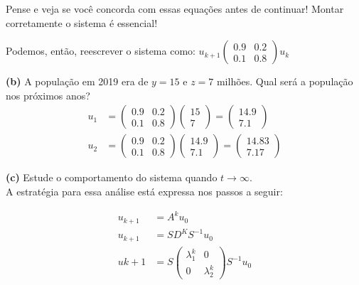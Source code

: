 \documentclass[12pt]{article}
\begin{document}
	Pense e veja se você concorda com essas equações antes de continuar! Montar corretamente o sistema é essencial!
	
	Podemos, então, reescrever o sistema como:
	$u_{k+1}\begin{pmatrix}
		0.9 & 0.2 \\
		0.1 & 0.8
	\end{pmatrix}u_k$
	
	\textbf{(b)} A população em 2019 era de $y=15$ e $z=7$ milhões. Qual será a população nos próximos anos?\\
	
	\begin{align*}
		u_1&=\begin{pmatrix}
			0.9 & 0.2 \\
			0.1 & 0.8
		\end{pmatrix}\begin{pmatrix}
			15 \\
			7
		\end{pmatrix}=
		\begin{pmatrix}
			14.9 \\
			7.1
		\end{pmatrix}\\
		u_2&=\begin{pmatrix}
			0.9 & 0.2 \\
			0.1 & 0.8
		\end{pmatrix}\begin{pmatrix}
			14.9 \\
			7.1
		\end{pmatrix}=
		\begin{pmatrix}
			14.83 \\
			7.17
		\end{pmatrix}
	\end{align*}
	
	\textbf{(c)} Estude o comportamento do sistema quando $t\to \infty$.\\
	
	A estratégia para essa análise está expressa nos passos a seguir:
	
	\begin{align*}
		u_{k+1}&=A^ku_0\\
		u_{k+1}&=SD^{K}S^{-1}u_0\\
		u{k+1}&=S\begin{pmatrix}
			\lambda_1^k & 0 \\
			0 & \lambda_2^k
		\end{pmatrix}S^{-1}u_0
	\end{align*}
	
\end{document}

